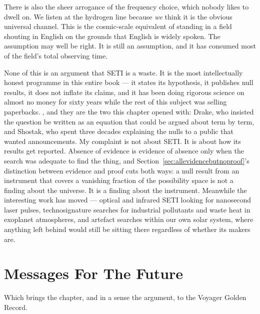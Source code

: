 \begin{funfact}
There is also the sheer arrogance of the frequency choice, which nobody likes to dwell on. We listen
at the hydrogen line because \emph{we} think it is the obvious universal channel. This is the
cosmic-scale equivalent of standing in a field shouting in English on the grounds that English is
widely spoken. The assumption may well be right. It is still an assumption, and it has consumed most
of the field's total observing time.
\end{funfact}

None of this is an argument that SETI is a waste. It is the most intellectually honest programme in
this entire book --- it states its hypothesis, it publishes null results, it does not inflate its
claims, and it has been doing rigorous science on almost no money for sixty years while the rest of
this subject was selling paperbacks. , and they are
the two this chapter opened with: Drake, who insisted the question be written as an equation that could
be argued about term by term, and Shostak, who spent three decades explaining the nulls to a public that
wanted announcements. My complaint is not about SETI. It is about how its results get
reported. Absence of evidence is evidence of absence only when the search was adequate to find the
thing, and Section~\ref{sec:allevidencebutnoproof}'s distinction between evidence and proof cuts both ways: a null result from an
instrument that covers a vanishing fraction of the possibility space is not a finding about the
universe. It is a finding about the instrument. Meanwhile the interesting work has moved --- optical
and infrared SETI looking for nanosecond laser pulses, technosignature searches for industrial
pollutants and waste heat in exoplanet atmospheres, and artefact searches within our own solar system,
where anything left behind would still be sitting there regardless of whether its makers are.

\section{Messages For The Future}\label{sec:messagesfuture}

Which brings the chapter, and in a sense the argument, to the Voyager Golden Record.

